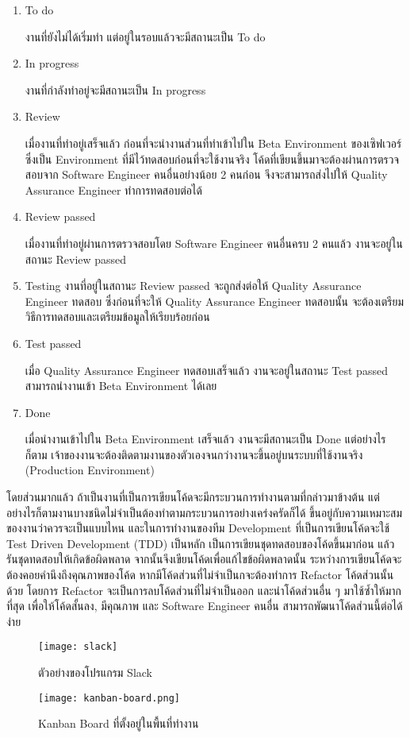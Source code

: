 \begin{enumerate}
	\item To do
	
	งานที่ยังไม่ได้เริ่มทำ แต่อยู่ในรอบแล้วจะมีสถานะเป็น To do
	
	\item In progress
	
	งานที่กำลังทำอยู่จะมีสถานะเป็น In progress
	
	\item Review
	
	เมื่องานที่ทำอยู่เสร็จแล้ว ก่อนที่จะนำงานส่วนที่ทำเข้าไปใน Beta Environment ของเซิฟเวอร์ ซึ่งเป็น Environment ที่มีไว้ทดสอบก่อนที่จะใช้งานจริง โค้ดที่เขียนขึ้นมาจะต้องผ่านการตรวจสอบจาก Software Engineer คนอื่นอย่างน้อย 2 คนก่อน จึงจะสามารถส่งไปให้ Quality Assurance Engineer ทำการทดสอบต่อได้
	
	\item Review passed
	
	เมื่องานที่ทำอยู่ผ่านการตรวจสอบโดย Software Engineer คนอื่นครบ 2 คนแล้ว งานจะอยู่ในสถานะ Review passed 
	
	\item Testing
	งานที่อยู่ในสถานะ Review passed จะถูกส่งต่อให้ Quality Assurance Engineer ทดสอบ ซึ่งก่อนที่จะให้ Quality Assurance Engineer ทดสอบนั้น จะต้องเตรียมวิธีการทดสอบและเตรียมข้อมูลให้เรียบร้อยก่อน
	
	\item Test passed
	
	เมื่อ Quality Assurance Engineer ทดสอบเสร็จแล้ว งานจะอยู่ในสถานะ Test passed สามารถนำงานเข้า Beta Environment ได้เลย
	
	\item Done
	
	เมื่อนำงานเข้าไปใน Beta Environment เสร็จแล้ว งานจะมีสถานะเป็น Done แต่อย่างไรก็ตาม เจ้าของงานจะต้องติดตามงานของตัวเองจนกว่างานจะขึ้นอยู่บนระบบที่ใช้งานจริง (Production Environment)
\end{enumerate}

โดยส่วนมากแล้ว ถ้าเป็นงานที่เป็นการเขียนโค้ดจะมีกระบวนการทำงานตามที่กล่าวมาข้างต้น แต่อย่างไรก็ตามงานบางชนิดไม่จำเป็นต้องทำตามกระบวนการอย่างเคร่งครัดก็ได้ ขึ้นอยู่กับความเหมาะสมของงานว่าควรจะเป็นแบบไหน และในการทำงานของทีม Development ที่เป็นการเขียนโค้ดจะใช้ Test Driven Development (TDD) เป็นหลัก เป็นการเขียนชุดทดสอบของโค้ดขึ้นมาก่อน แล้วรันชุดทดสอบให้เกิดข้อผิดพลาด จากนั้นจึงเขียนโค้ดเพื่อแก้ไขข้อผิดพลาดนั้น ระหว่างการเขียนโค้ดจะต้องคอยคำนึงถึงคุณภาพของโค้ด หากมีโค้ดส่วนที่ไม่จำเป็นกจะต้องทำการ Refactor โค้ดส่วนนั้นด้วย โดยการ Refactor จะเป็นการลบโค้ดส่วนที่ไม่จำเป็นออก และนำโค้ดส่วนอื่น ๆ มาใช้ซ้ำให้มากที่สุด เพื่อให้โค้ดสั้นลง, มีคุณภาพ และ Software Engineer คนอื่น สามารถพัฒนาโค้ดส่วนนี้ต่อได้ง่าย

\begin{figure}[!h]
	\centering
	\texttt{[image: slack]}  
	\caption{ตัวอย่างของโปรแกรม Slack}
	\label{Fig:slack}
\end{figure}

\begin{figure}[!h]
	\centering
	\texttt{[image: kanban-board.png]}  
	\caption{Kanban Board ที่ตั้งอยู่ในพื้นที่ทำงาน}
	\label{Fig:kanban-board}
\end{figure}